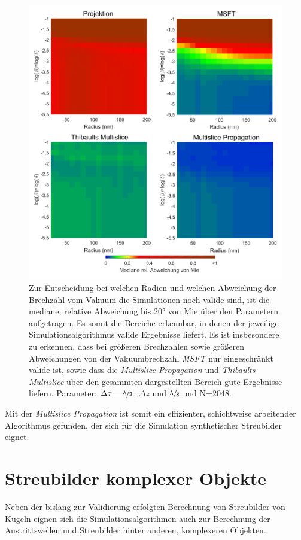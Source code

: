 \begin{figure} %
	\centering
	\includegraphics[width=1\textwidth]{images/fig_sim_var.pdf}
	\caption[Gültigkeit der Simulationsalgorithmen]{Zur Entscheidung bei welchen Radien und welchen Abweichung der Brechzahl vom Vakuum die Simulationen noch valide sind, ist die mediane, relative Abweichung bis 20° von Mie über den Parametern aufgetragen. Es somit die Bereiche erkennbar, in denen der jeweilige Simulationsalgorithmus valide Ergebnisse liefert. Es ist insbesondere zu erkennen, dass bei größeren Brechzahlen sowie größeren Abweichungen von der Vakuumbrechzahl \textit{MSFT} nur eingeschränkt valide ist, sowie dass die \textit{Multislice Propagation} und \textit{Thibaults Multislice} über den gesammten dargestellten Bereich gute Ergebnisse liefern. Parameter: $\Delta x=\sfrac{\lambda}{2}$, $\Delta z$ und $\sfrac{\lambda}{8}$ und N=2048.}
	\label{fig:variation}
\end{figure}

Mit der \textit{Multislice Propagation} ist somit ein effizienter, schichtweise arbeitender Algorithmus gefunden, der sich für die Simulation synthetischer Streubilder eignet.


\section{Streubilder komplexer Objekte}
Neben der bislang zur Validierung erfolgten Berechnung von Streubilder von Kugeln eignen sich die Simulationsalgorithmen auch zur Berechnung der Austrittswellen und Streubilder hinter anderen, komplexeren Objekten.

